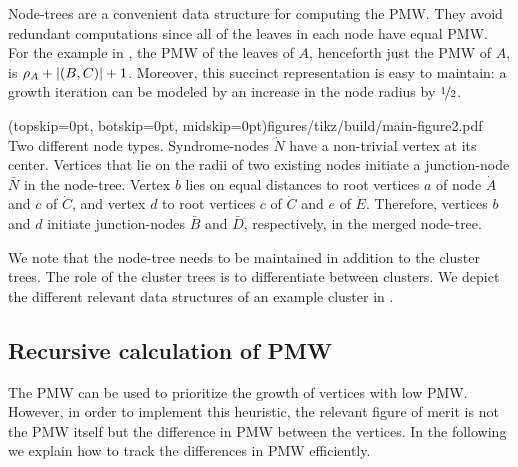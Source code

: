 
Node-trees are a convenient data structure for computing the PMW. %
They avoid redundant computations since all of the leaves in each node have equal PMW. For the example in , the PMW of the leaves of $A$, henceforth just the PMW of $A$, is $\rho_A + \lvert(B,C)\rvert +1$. Moreover, this succinct representation is easy to maintain: a growth iteration can be modeled by an increase in the node radius by $\nicefrac{1}{2}$.

\Figure[bt](topskip=0pt, botskip=0pt, midskip=0pt){figures/tikz/build/main-figure2.pdf}{
Two different node types. Syndrome-nodes $\dot N$ have a non-trivial vertex at its center. Vertices that lie on the radii of two existing nodes initiate a junction-node $\bar{N}$ in the node-tree. Vertex $b$ lies on equal distances to root vertices $a$ of node $\dot{A}$ and $c$ of $\dot{C}$, and vertex $d$ to root vertices $c$ of $\dot{C}$ and $e$ of $\dot{E}$. Therefore, vertices $b$ and $d$ initiate junction-nodes $\bar{B}$ and $\bar{D}$, respectively, in the merged node-tree. \label{fig:nodes}}

We note that the node-tree needs to be maintained in addition to the cluster trees. The role of the cluster trees is to differentiate between clusters.
We depict the different relevant data structures %
of an example cluster in . %

\subsection{Recursive calculation of PMW}\label{sec:paritydelay}
The PMW can be used to prioritize the growth of vertices with low PMW. However, in order to implement this heuristic, the relevant figure of merit is not the PMW itself but the difference in PMW between the vertices. In the following we explain how to track the differences in PMW efficiently.

